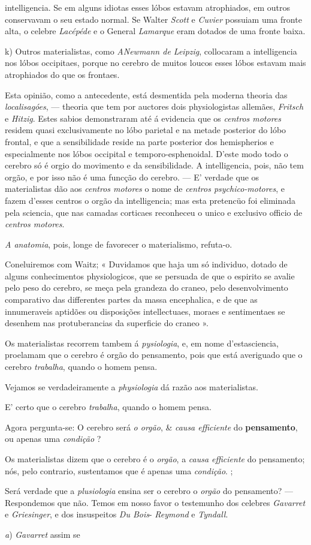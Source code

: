 intelligencia. Se em alguns idiotas esses lóbos estavam atrophiados, em outros conservavam o seu estado normal. Se Walter \emph{Scott} e \emph{Cuvier} possuiam uma fronte alta, o celebre \emph{Lacépéde} e o General \emph{Lamarque} eram dotados de uma fronte baixa.\par k) Outros materialistas, como \emph{ANewmann de Leipzig}, collocaram a intelligencia nos lóbos occipitaes, porque no cerebro de muitos loucos esses lóbos estavam mais atrophiados do que os frontaes.\par Esta opinião, como a antecedente, está desmentida pela moderna theoria das \emph{localisagóes}, --- theoria que tem por auctores dois physiologistas allemães, \emph{Fritsch} e \emph{Hitzig}. Estes sabios demonstraram até á evidencia que os \emph{centros motores} residem quasi exclusivamente no lóbo parietal e na metade posterior do lóbo frontal, e que a sensibilidade reside na parte posterior dos hemispherios e especialmente nos lóbos occipital e temporo-esphenoidal. D'este modo todo o cerebro só é orgio do movimento e da sensibilidade. A intelligencia, pois, não tem orgão, e por isso não é uma funcção do cerebro. --- E' verdade que os materialistas dão aos \emph{centros motores} o nome de \emph{centros psychico-motores}, e fazem d'esses centros o orgão da intelligencia; mas esta pretencüo foi eliminada pela sciencia, que nas camadas corticaes reconheceu o unico e exclusivo officio de \emph{centros motores}.\par \emph{A anatomia}, pois, longe de favorecer o materialismo, refuta-o.\par Coneluiremos com Waitz; « Duvidamos que haja um só individuo, dotado de alguns conhecimentos physiologicos, que se persuada de que o espirito se avalie pelo peso do cerebro, se meça pela grandeza do craneo, pelo desenvolvimento comparativo das differentes partes da massa encephalica, e de que as innumeraveis aptidões ou disposições intellectuaes, moraes e sentimentaes se desenhem nas protuberancias da superficie do craneo ».\par Os materialistas recorrem tambem á \emph{pysiologia}, e, em nome d'estasciencia, proelamam que o cerebro é orgão do pensamento, pois que está averiguado que o cerebro \emph{trabalha}, quando o homem pensa.\par Vejamos se verdadeiramente a \emph{physiologia} dá razão aos materialistas.\par E' certo que o cerebro \emph{trabalha}, quando o homem pensa.\par Agora pergunta-se: O cerebro será \emph{o orgão}, \& \emph{causa efficiente} do \textbf{pensamento}, ou apenas uma \emph{condição} ?\par Os materialistas dizem que o cerebro é o \emph{orgão}, a \emph{causa efficiente} do pensamento; nós, pelo contrario, sustentamos que é apenas uma \emph{condição}. ;\par Será verdade que a \emph{plusiologia} ensina ser o cerebro o \emph{orgão} do pensamento? --- Respondemos que não. Temos em nosso favor o testemunho dos celebres \emph{Gavarret} e \emph{Griesinger}, e dos insuspeitos \emph{Du Bois}- \emph{Reymond} e \emph{Tyndall}.\par \emph{a}) \emph{Gavarret} assim se 